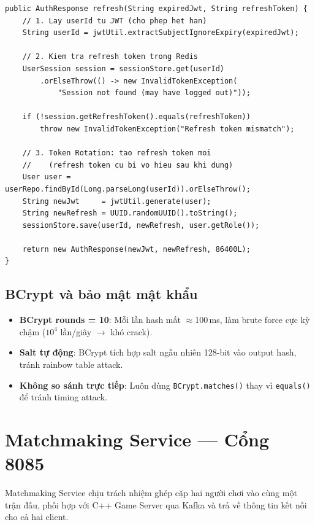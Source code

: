 \documentclass[12pt,a4paper]{report}
\begin{document}
\begin{lstlisting}[style=javaStyle, caption={Xử lý refresh token với rotation}, label={lst:refresh}]
public AuthResponse refresh(String expiredJwt, String refreshToken) {
    // 1. Lay userId tu JWT (cho phep het han)
    String userId = jwtUtil.extractSubjectIgnoreExpiry(expiredJwt);

    // 2. Kiem tra refresh token trong Redis
    UserSession session = sessionStore.get(userId)
        .orElseThrow(() -> new InvalidTokenException(
            "Session not found (may have logged out)"));

    if (!session.getRefreshToken().equals(refreshToken))
        throw new InvalidTokenException("Refresh token mismatch");

    // 3. Token Rotation: tao refresh token moi
    //    (refresh token cu bi vo hieu sau khi dung)
    User user = userRepo.findById(Long.parseLong(userId)).orElseThrow();
    String newJwt     = jwtUtil.generate(user);
    String newRefresh = UUID.randomUUID().toString();
    sessionStore.save(userId, newRefresh, user.getRole());

    return new AuthResponse(newJwt, newRefresh, 86400L);
}
\end{lstlisting}

\subsection{BCrypt và bảo mật mật khẩu}

\begin{itemize}
  \item \textbf{BCrypt rounds = 10}: Mỗi lần hash mất $\approx$100\,ms, làm brute force cực kỳ chậm ($10^4$ lần/giây $\rightarrow$ khó crack).
  \item \textbf{Salt tự động}: BCrypt tích hợp salt ngẫu nhiên 128-bit vào output hash, tránh rainbow table attack.
  \item \textbf{Không so sánh trực tiếp}: Luôn dùng \texttt{BCrypt.matches()} thay vì \texttt{equals()} để tránh timing attack.
\end{itemize}

\section{Matchmaking Service --- Cổng 8085}

Matchmaking Service chịu trách nhiệm ghép cặp hai người chơi vào cùng một trận đấu, phối hợp với C++ Game Server qua Kafka và trả về thông tin kết nối cho cả hai client.
\end{document}
